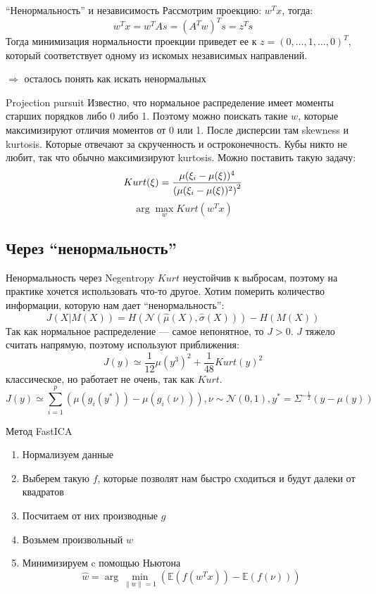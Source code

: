 \documentclass[14pt, fleqn, xcolor={dvipsnames, table}]{beamer}
\begin{document}
\begin{frame}{``Ненормальность'' и независимость}
Рассмотрим проекцию: $w^T x$, тогда:
$$
w^T x = w^T As = (A^T w)^T s = z^T s
$$
Тогда минимизация нормальности проекции приведет ее к $z = (0,\ldots,1,\ldots,0)^T$, который соответствует одному из искомых независимых направлений.

$\Rightarrow$ осталось понять как искать ненормальных
\end{frame}

\begin{frame}{Projection pursuit}
\small
Известно, что нормальное распределение имеет моменты старших порядков либо 0 либо 1. Поэтому можно поискать такие $w$, которые максимизируют отличия моментов от 0 или 1. После дисперсии там skewness и kurtosis. Которые отвечают за скрученность и остроконечность. Кубы никто не любит, так что обычно максимизируют kurtosis. Можно поставить такую задачу:
$$
Kurt(\xi)={\mu(\xi_i - \mu(\xi))^4\over \left(\mu(\xi_i - \mu(\xi))^2\right)^2}
$$
$$
\arg \max_w Kurt(w^T x)
$$

\end{frame}

\subsection{Через ``ненормальность''}

\begin{frame}{Ненормальность через Negentropy}
\small
$Kurt$ неустойчив к выбросам, поэтому на практике хочется использовать что-то другое. Хотим померить количество информации, которую нам дает ``ненормальность'':
$$
J(X|M(X)) = H(\mathcal{N}(\hat{\mu}(X),\hat{\sigma}(X))) - H(M(X))
$$
Так как нормальное распределение --- самое непонятное, то $J > 0$. $J$ тяжело считать напрямую, поэтому используют приближения:
$$
J(y) \simeq \frac{1}{12}\mu(y^3)^2 + \frac{1}{48}Kurt(y)^2
$$
классическое, но работает не очень, так как $Kurt$. 
$$
J(y) \simeq \sum_{i=1}^p (\mu(g_i(y^*)) - \mu(g_i(\nu))), \nu \sim \mathcal{N}(0,1), y^* = \Sigma^{-\frac{1}{2}} (y - \mu(y))
$$
\end{frame}

\begin{frame}{Метод FastICA}
\begin{enumerate}
  \item Нормализуем данные
  \item Выберем такую $f$, которые позволят нам быстро сходиться и будут далеки от квадратов
  \item Посчитаем от них производные $g$
  \item Возьмем произвольный $w$
  \item Минимизируем c помощью Ньютона
$$
\hat{w} = \arg \min_{\|w\| = 1} (\mathbb{E}(f(w^T x)) - \mathbb{E}(f(\nu)))
$$
  
\end{enumerate}
\end{frame}
\end{document}

